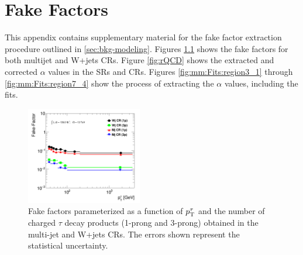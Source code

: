 \chapter{Fake Factors}\label{app:fake-factors}
	This appendix contains supplementary material for the fake factor extraction procedure outlined in \ref{sec:bkg-modeling}. Figures \ref{fig:bkg-FF-CR} shows the fake factors for both multijet and W+jets \glspl{CR}. Figure \ref{fig:rQCD} shows the extracted and corrected $\alpha$ values in the \glspl{SR} and \glspl{CR}. Figures \ref{fig:mm:Fits:region3_1} through \ref{fig:mm:Fits:region7_4} show the process of extracting the $\alpha$ values, including the fits.

	\begin{figure}[!thp]
	\begin{center}
	\includegraphics[width=0.45\textwidth]{chapters/chapter6_HPlus/images/FFs/FFs_inclusive_tracks_pT_FFsCR.png}
	\end{center}
	\caption{ Fake factors parameterized as a function of $p_{\text{T}}^{\tau}$ and the number of charged $\tau$ decay products (1-prong and 3-prong) obtained in the multi-jet and W+jets CRs. The errors shown represent the statistical uncertainty. 
	}
	\label{fig:bkg-FF-CR}
	\end{figure}

